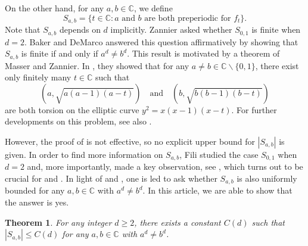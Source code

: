 \documentclass[11pt]{amsart}
\numberwithin{equation}{section}
\theoremstyle{plain}
\newtheorem{thm}{Theorem}[section]
\theoremstyle{definition}
\theoremstyle{remark}
\newcommand{\C}{\mathbb C}
\begin{document}
On the other hand, for any $a,b\in\C$, we define
\[
S_{a,b}=\{t\in\C:a\text{ and }b\text{ are both preperiodic for }f_{t}\}.
\]
Note that $S_{a,b}$ depends on $d$ implicitly. Zannier \cite[Section 3.4.7]{Za}
asked whether $S_{0,1}$ is finite when $d=2$. Baker and DeMarco
\cite[Theorem 1.1]{BD1} answered this question affirmatively by showing
that $S_{a,b}$ is finite if and only if $a^{d}\neq b^{d}$. This
result is motivated by a theorem of Masser and Zannier. In \cite{MZ1,MZ2,MZ3}, they showed that for any $a\neq b\in\C\backslash\{0,1\}$,
there exist only finitely many $t\in\C$ such that
\[
\left(a,\sqrt{a(a-1)(a-t)}\right)\quad\text{and}\quad\left(b,\sqrt{b(b-1)(b-t)}\right)
\]
are both torsion on the elliptic curve $y^{2}=x(x-1)(x-t)$. For further
developments on this problem, see also \cite{BD2,GHT1,GHT2}.

However, the proof of \cite[Theorem 1.1]{BD1} is not effective, so no
explicit upper bound for $|S_{a,b}|$ is given. In order to find more
information on $S_{a,b}$, Fili \cite{Fi} studied the case $S_{0,1}$
when $d=2$ and, more importantly, made a key observation, see
\cite[Theorem 1]{Fi}, which turns out to be crucial for \cite{DKY1}
and \cite{DKY2}. In light of \cite[Theorem 1.4]{DKY1} and
\cite[Theorem 1.1]{DKY2}, one is led to ask whether $S_{a,b}$ is also
uniformly bounded for any $a,b\in\C$ with $a^{d}\neq b^{d}$. In this
article, we are able to show that the answer is yes.

\begin{thm}\label{thm1.1}
For any integer $d\geq2$, there exists a constant
$C(d)$ such that $|S_{a,b}|\leq C(d)$ for any $a,b\in\C$
with $a^{d}\neq b^{d}$.
\end{thm}
\end{document}
